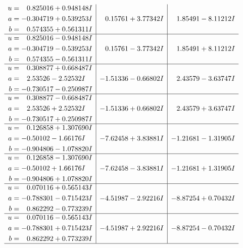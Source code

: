 \documentclass[1p]{elsarticle_modified}
\theoremstyle{definition}
\begin{document}
$$\begin{array}{c|c|c}
\begin{aligned}
u &= \phantom{-}0.825016 + 0.948148 I \\
a &= -0.304719 + 0.539253 I \\
b &= \phantom{-}0.574355 + 0.561311 I\end{aligned}
 & \phantom{-}0.15761 + 3.77342 I & \phantom{-}1.85491 - 8.11212 I \\ \hline\begin{aligned}
u &= \phantom{-}0.825016 - 0.948148 I \\
a &= -0.304719 - 0.539253 I \\
b &= \phantom{-}0.574355 - 0.561311 I\end{aligned}
 & \phantom{-}0.15761 - 3.77342 I & \phantom{-}1.85491 + 8.11212 I \\ \hline\begin{aligned}
u &= \phantom{-}0.308877 + 0.668487 I \\
a &= \phantom{-}2.53526 - 2.52532 I \\
b &= -0.730517 - 0.250987 I\end{aligned}
 & -1.51336 - 0.66802 I & \phantom{-}2.43579 - 3.63747 I \\ \hline\begin{aligned}
u &= \phantom{-}0.308877 - 0.668487 I \\
a &= \phantom{-}2.53526 + 2.52532 I \\
b &= -0.730517 + 0.250987 I\end{aligned}
 & -1.51336 + 0.66802 I & \phantom{-}2.43579 + 3.63747 I \\ \hline\begin{aligned}
u &= \phantom{-}0.126858 + 1.307690 I \\
a &= -0.50102 - 1.66176 I \\
b &= -0.904806 - 1.078820 I\end{aligned}
 & -7.62458 + 3.83881 I & -1.21681 - 1.31905 I \\ \hline\begin{aligned}
u &= \phantom{-}0.126858 - 1.307690 I \\
a &= -0.50102 + 1.66176 I \\
b &= -0.904806 + 1.078820 I\end{aligned}
 & -7.62458 - 3.83881 I & -1.21681 + 1.31905 I \\ \hline\begin{aligned}
u &= \phantom{-}0.070116 + 0.565143 I \\
a &= -0.788301 - 0.715423 I \\
b &= \phantom{-}0.862292 - 0.773239 I\end{aligned}
 & -4.51987 - 2.92216 I & -8.87254 + 0.70432 I \\ \hline\begin{aligned}
u &= \phantom{-}0.070116 - 0.565143 I \\
a &= -0.788301 + 0.715423 I \\
b &= \phantom{-}0.862292 + 0.773239 I\end{aligned}
 & -4.51987 + 2.92216 I & -8.87254 - 0.70432 I\\
 \hline 
 \end{array}$$\newpage
\end{document}
